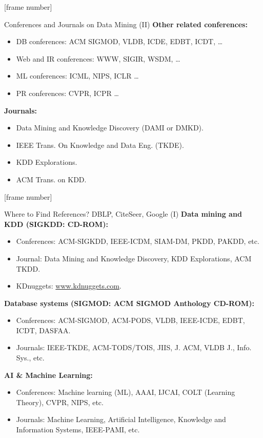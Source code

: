\documentclass[aspectratio=169,t]{beamer}
\begin{document}
  {
    [frame number]
    \begin{frame}{Conferences and Journals on Data Mining (II)}
    \textbf{Other related conferences:}
        \begin{itemize}
            \item DB conferences: ACM SIGMOD, VLDB, ICDE, EDBT, ICDT, \ldots
            \item Web and IR conferences: WWW, SIGIR, WSDM, \ldots
            \item ML conferences: ICML, NIPS, ICLR \ldots
            \item PR conferences: CVPR, ICPR \ldots
        \end{itemize}
    \textbf{Journals:}
        \begin{itemize}
            \item Data Mining and Knowledge Discovery (DAMI or DMKD).
            \item IEEE Trans. On Knowledge and Data Eng. (TKDE).
            \item KDD Explorations.
            \item ACM Trans. on KDD.
        \end{itemize}
    \end{frame}
  }

  {
    [frame number]
    \begin{frame}{Where to Find References? DBLP, CiteSeer, Google (I)}
    \textbf{Data mining and KDD (SIGKDD: CD-ROM):}
        \begin{itemize}
            \item Conferences: ACM-SIGKDD, IEEE-ICDM, SIAM-DM, PKDD, PAKDD, etc.
            \item Journal: Data Mining and Knowledge Discovery, KDD Explorations, ACM TKDD.
            \item KDnuggets: \url{www.kdnuggets.com}.
        \end{itemize}
    \textbf{Database systems (SIGMOD: ACM SIGMOD Anthology CD-ROM):}
        \begin{itemize}
            \item Conferences: ACM-SIGMOD, ACM-PODS, VLDB, IEEE-ICDE, EDBT, ICDT, DASFAA.
            \item Journals: IEEE-TKDE, ACM-TODS/TOIS, JIIS, J. ACM, VLDB J., Info. Sys., etc.
        \end{itemize}
    \textbf{AI \& Machine Learning:}
        \begin{itemize}
            \item Conferences: Machine learning (ML), AAAI, IJCAI, COLT (Learning Theory), CVPR, NIPS, etc.
            \item Journals: Machine Learning, Artificial Intelligence, Knowledge and Information Systems, IEEE-PAMI, etc.
        \end{itemize}
    \end{frame}
  }
\end{document}
